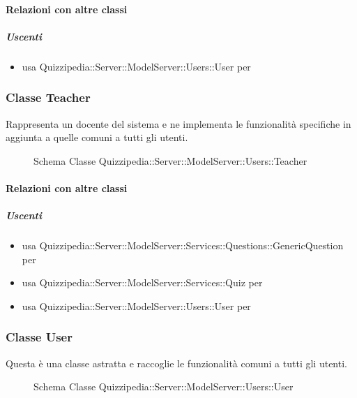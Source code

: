\paragraph{Relazioni con altre classi}
\subparagraph{Uscenti}
\begin{itemize}
\item usa Quizzipedia::Server::ModelServer::Users::User per 
\end{itemize}
\subsubsection{Classe Teacher}
Rappresenta un docente del sistema e ne implementa le funzionalità specifiche in aggiunta a quelle comuni a tutti gli utenti.
\begin{figure}[H]
\centering
\noindent{}
\caption[Schema Classe Teacher]{Schema Classe Quizzipedia::Server::ModelServer::Users::Teacher}
\end{figure}
\paragraph{Relazioni con altre classi}
\subparagraph{Uscenti}
\begin{itemize}
\item usa Quizzipedia::Server::ModelServer::Services::Questions::GenericQuestion per 
\item usa Quizzipedia::Server::ModelServer::Services::Quiz per 
\item usa Quizzipedia::Server::ModelServer::Users::User per 
\end{itemize}
\subsubsection{Classe User}
Questa è una classe astratta e raccoglie le funzionalità comuni a tutti gli utenti.
\begin{figure}[H]
\centering
\noindent{}
\caption[Schema Classe User]{Schema Classe Quizzipedia::Server::ModelServer::Users::User}
\end{figure}
